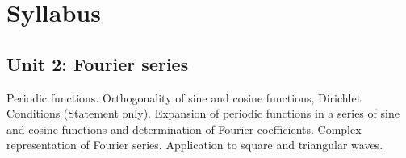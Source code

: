 \section*{Syllabus}

    \subsection*{Unit 2: Fourier series}
        Periodic functions. Orthogonality of sine and cosine functions, Dirichlet Conditions (Statement only). Expansion of periodic functions in a series of sine and cosine functions and determination of Fourier coefficients. Complex representation of Fourier series. Application to square and triangular waves.